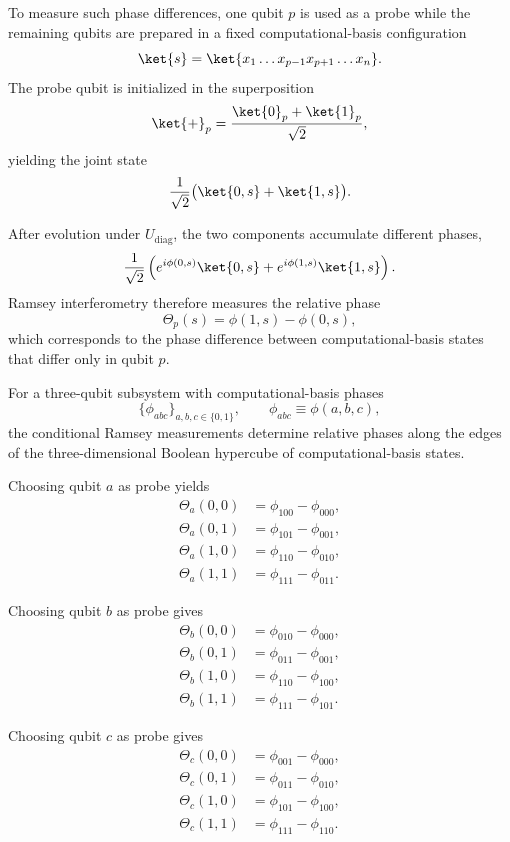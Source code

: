\medskip
\noindent
To measure such phase differences, one qubit $p$ is used as a probe while the remaining qubits are prepared in a fixed computational-basis configuration
\[
\ket{s}=\ket{x_1\dots x_{p-1}x_{p+1}\dots x_n}.
\]
The probe qubit is initialized in the superposition
\[
\ket{+}_p=\frac{\ket{0}_p+\ket{1}_p}{\sqrt2},
\]
yielding the joint state
\[
\frac{1}{\sqrt2}\bigl(\ket{0,s}+\ket{1,s}\bigr).
\]

\medskip
\noindent
After evolution under $U_{\mathrm{diag}}$, the two components accumulate different phases,
\[
\frac{1}{\sqrt2}
\left(
e^{i\phi(0,s)}\ket{0,s}
+
e^{i\phi(1,s)}\ket{1,s}
\right).
\]
Ramsey interferometry therefore measures the relative phase
\begin{equation}
\Theta_p(s)=\phi(1,s)-\phi(0,s),
\label{eq:ramsey_phase}
\end{equation}
which corresponds to the phase difference between computational-basis states that differ only in qubit $p$.

\medskip
\noindent
For a three-qubit subsystem with computational-basis phases
\[
\{\phi_{abc}\}_{a,b,c\in\{0,1\}},
\qquad
\phi_{abc}\equiv \phi(a,b,c),
\]
the conditional Ramsey measurements determine relative phases along the edges of the three-dimensional Boolean hypercube of computational-basis states.

\medskip
\noindent
Choosing qubit $a$ as probe yields
\begin{align}
\Theta_a(0,0) &= \phi_{100}-\phi_{000}, \\
\Theta_a(0,1) &= \phi_{101}-\phi_{001}, \\
\Theta_a(1,0) &= \phi_{110}-\phi_{010}, \\
\Theta_a(1,1) &= \phi_{111}-\phi_{011}.
\end{align}

\noindent
Choosing qubit $b$ as probe gives
\begin{align}
\Theta_b(0,0) &= \phi_{010}-\phi_{000}, \\
\Theta_b(0,1) &= \phi_{011}-\phi_{001}, \\
\Theta_b(1,0) &= \phi_{110}-\phi_{100}, \\
\Theta_b(1,1) &= \phi_{111}-\phi_{101}.
\end{align}

\noindent
Choosing qubit $c$ as probe gives
\begin{align}
\Theta_c(0,0) &= \phi_{001}-\phi_{000}, \\
\Theta_c(0,1) &= \phi_{011}-\phi_{010}, \\
\Theta_c(1,0) &= \phi_{101}-\phi_{100}, \\
\Theta_c(1,1) &= \phi_{111}-\phi_{110}.
\end{align}

